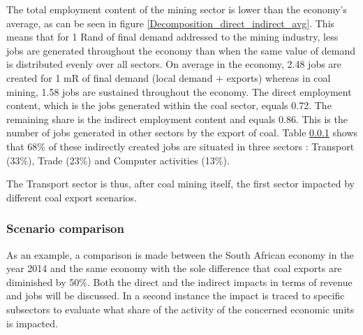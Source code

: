 \documentclass[12pt,english]{article}
\begin{document}
%


The total employment content of the mining sector is lower than the economy's average, as can be seen in figure \ref{Decomposition_direct_indirect_avg}. This means that for 1 Rand of final demand addressed to the mining industry, less jobs are generated throughout the economy than when the same value of demand is distributed evenly over all sectors. On average in the economy, 2.48 jobs are created for 1 mR of final demand (local demand + exports) whereas in coal mining, 1.58 jobs are sustained throughout the economy. %
The direct employment content, which is the jobs generated within the coal sector, equals 0.72. The remaining share is the indirect employment content and equals 0.86. This is the number of jobs generated in other sectors by the export of coal. Table \ref{} shows that 68\% of these indirectly created jobs are situated in three sectors : Transport (33\%), Trade (23\%) and Computer activities (13\%). 

The Transport sector is thus, after coal mining itself, the first sector impacted by different coal export scenarios. 



\subsubsection{Scenario comparison}
As an example, a comparison is made between the South African economy in the year 2014 and the same economy with the sole difference that coal exports are diminished by 50\%. Both the direct and the indirect impacts in terms of revenue and jobs will be discussed. In a second instance the impact is traced to specific subsectors to evaluate what share of the activity of the concerned economic units is impacted.
\end{document}
